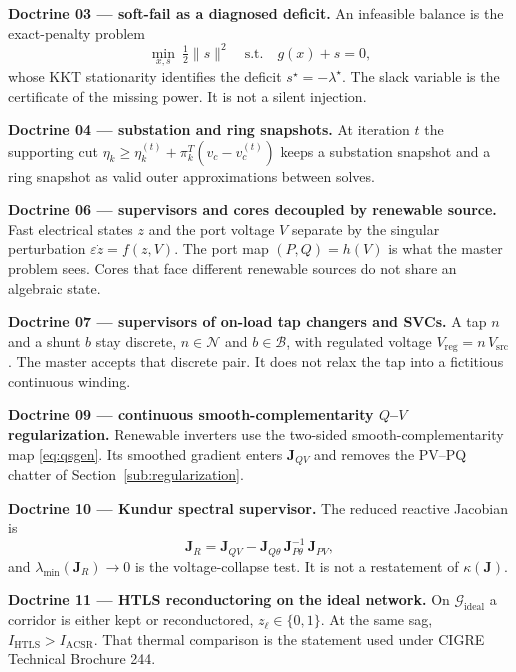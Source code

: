 \textbf{Doctrine 03 --- soft-fail as a diagnosed deficit.} An infeasible balance is the exact-penalty problem
\begin{equation}
\min_{x,s}\ \tfrac12\lVert s\rVert^{2}\quad\mathrm{s.t.}\quad g(x)+s=0,
\label{eq:softfail}
\end{equation}
whose KKT stationarity identifies the deficit $s^{\star}=-\lambda^{\star}$. The slack variable is the certificate of the missing power. It is not a silent injection.

\textbf{Doctrine 04 --- substation and ring snapshots.} At iteration $t$ the supporting cut $\eta_k\ge\eta_k^{(t)}+\pi_k^{T}(v_c-v_c^{(t)})$ keeps a substation snapshot and a ring snapshot as valid outer approximations between solves.

\textbf{Doctrine 06 --- supervisors and cores decoupled by renewable source.} Fast electrical states $z$ and the port voltage $V$ separate by the singular perturbation $\varepsilon\dot{z}=f(z,V)$. The port map $(P,Q)=h(V)$ is what the master problem sees. Cores that face different renewable sources do not share an algebraic state.

\textbf{Doctrine 07 --- supervisors of on-load tap changers and SVCs.} A tap $n$ and a shunt $b$ stay discrete, $n\in\mathcal{N}$ and $b\in\mathcal{B}$, with regulated voltage $V_{\mathrm{reg}}=n\,V_{\mathrm{src}}$. The master accepts that discrete pair. It does not relax the tap into a fictitious continuous winding.

\textbf{Doctrine 09 --- continuous smooth-complementarity $Q$--$V$ regularization.} Renewable inverters use the two-sided smooth-complementarity map \eqref{eq:qsgen}. Its smoothed gradient enters $\mathbf{J}_{QV}$ and removes the PV--PQ chatter of Section~\ref{sub:regularization}.

\textbf{Doctrine 10 --- Kundur spectral supervisor.} The reduced reactive Jacobian is
\begin{equation}
\mathbf{J}_R = \mathbf{J}_{QV} - \mathbf{J}_{Q\theta}\, \mathbf{J}_{P\theta}^{-1}\, \mathbf{J}_{PV},
\label{eq:jr}
\end{equation}
and $\lambda_{\min}(\mathbf{J}_R)\to 0$ is the voltage-collapse test. It is not a restatement of $\kappa(\mathbf{J})$.

\textbf{Doctrine 11 --- HTLS reconductoring on the ideal network.} On $\mathcal{G}_{\mathrm{ideal}}$ a corridor is either kept or reconductored, $z_{\ell}\in\{0,1\}$. At the same sag, $I_{\mathrm{HTLS}}>I_{\mathrm{ACSR}}$. That thermal comparison is the statement used under CIGRE Technical Brochure 244.

